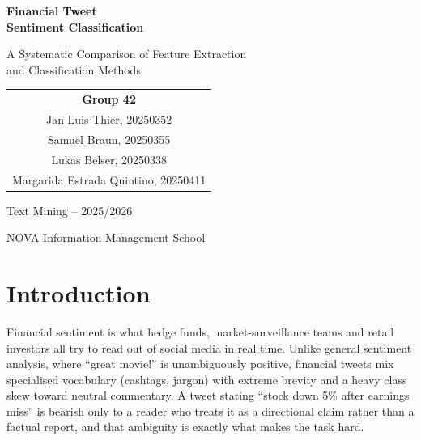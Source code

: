 \documentclass[12pt,a4paper]{article}
\begin{document}
\begin{titlepage}
    \centering
    \vspace*{3cm}

    {\Huge\bfseries Financial Tweet\\[8pt] Sentiment Classification\par}

    \vspace{1.5cm}

    {\Large A Systematic Comparison of Feature Extraction\\[4pt] and Classification Methods\par}

    \vspace{3cm}

    {\large
    \begin{tabular}{c}
        \textbf{Group 42}\\[12pt]
        Jan Luis Thier, 20250352\\
        Samuel Braun, 20250355\\
        Lukas Belser, 20250338\\
        Margarida Estrada Quintino, 20250411\\
    \end{tabular}
    \par}

    \vspace{2cm}

    {\large Text Mining -- 2025/2026\par}

    \vfill

    {\large NOVA Information Management School\par}
\end{titlepage}

{\setlength{\parskip}{2pt}\tableofcontents}

\newpage

\section{Introduction}

Financial sentiment is what hedge funds, market-surveillance teams and retail investors all try to read out of social media in real time. Unlike general sentiment analysis, where ``great movie!'' is unambiguously positive, financial tweets mix specialised vocabulary (cashtags, jargon) with extreme brevity and a heavy class skew toward neutral commentary. A tweet stating ``stock down 5\% after earnings miss'' is bearish only to a reader who treats it as a directional claim rather than a factual report, and that ambiguity is exactly what makes the task hard.
\end{document}
